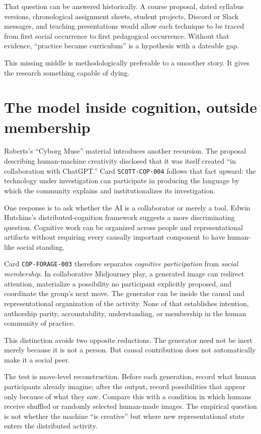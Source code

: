 \documentclass[11pt]{article}
\begin{document}
That question can be answered historically. A course proposal, dated syllabus versions, chronological assignment sheets, student projects, Discord or Slack messages, and teaching presentations would allow each technique to be traced from first social occurrence to first pedagogical occurrence. Without that evidence, ``practice became curriculum'' is a hypothesis with a dateable gap.

This missing middle is methodologically preferable to a smoother story. It gives the research something capable of dying.

\section{The model inside cognition, outside membership}

Roberts's ``Cyborg Muse'' material introduces another recursion. The proposal describing human-machine creativity disclosed that it was itself created ``in collaboration with ChatGPT.'' Card \texttt{SCOTT-COP-004} follows that fact upward: the technology under investigation can participate in producing the language by which the community explains and institutionalizes its investigation.

One response is to ask whether the AI is a collaborator or merely a tool. Edwin Hutchins's distributed-cognition framework suggests a more discriminating question. Cognitive work can be organized across people and representational artifacts without requiring every causally important component to have human-like social standing.

Card \texttt{COP-FORAGE-003} therefore separates \emph{cognitive participation} from \emph{social membership}. In collaborative Midjourney play, a generated image can redirect attention, materialize a possibility no participant explicitly proposed, and coordinate the group's next move. The generator can be inside the causal and representational organization of the activity. None of that establishes intention, authorship parity, accountability, understanding, or membership in the human community of practice.

This distinction avoids two opposite reductions. The generator need not be inert merely because it is not a person. But causal contribution does not automatically make it a social peer.

The test is move-level reconstruction. Before each generation, record what human participants already imagine; after the output, record possibilities that appear only because of what they saw. Compare this with a condition in which humans receive shuffled or randomly selected human-made images. The empirical question is not whether the machine ``is creative'' but where new representational state enters the distributed activity.
\end{document}
